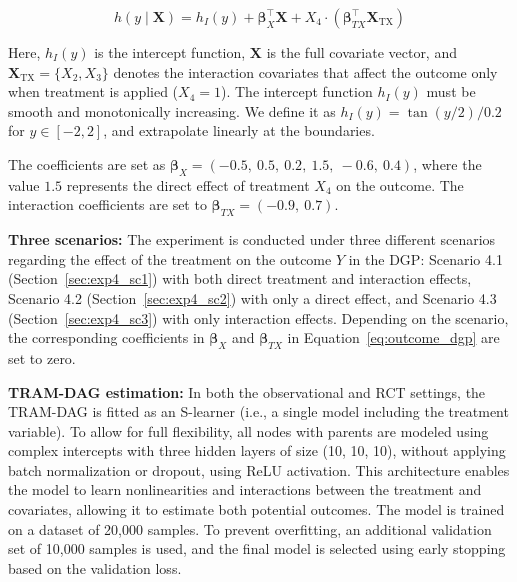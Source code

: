 \begin{equation}
h(y \mid \mathbf{X}) = h_I(y) + \boldsymbol{\beta}_X^\top \mathbf{X} + X_4 \cdot (\boldsymbol{\beta}_{TX}^\top \mathbf{X}_{\text{TX}})
\label{eq:outcome_dgp}
\end{equation}

Here, $h_I(y)$ is the intercept function, $\mathbf{X}$ is the full covariate vector, and $\mathbf{X}_{\text{TX}} = \{X_2, X_3\}$ denotes the interaction covariates that affect the outcome only when treatment is applied ($X_4 = 1$). The intercept function $h_I(y)$ must be smooth and monotonically increasing. We define it as $h_I(y) = \tan(y/2) / 0.2$ for $y \in [-2, 2]$, and extrapolate linearly at the boundaries.

The coefficients are set as $\boldsymbol{\beta}_X = (-0.5,\ 0.5,\ 0.2,\ 1.5,\ -0.6,\ 0.4)$, where the value $1.5$ represents the direct effect of treatment $X_4$ on the outcome. The interaction coefficients are set to $\boldsymbol{\beta}_{TX} = (-0.9,\ 0.7)$.

\medskip

\textbf{Three scenarios:} The experiment is conducted under three different scenarios regarding the effect of the treatment on the outcome $Y$ in the DGP: Scenario 4.1 (Section~\ref{sec:exp4_sc1}) with both direct treatment and interaction effects, Scenario 4.2 (Section~\ref{sec:exp4_sc2}) with only a direct effect, and Scenario 4.3 (Section~\ref{sec:exp4_sc3}) with only interaction effects. Depending on the scenario, the corresponding coefficients in $\boldsymbol{\beta}_X$ and $\boldsymbol{\beta}_{TX}$ in Equation~\ref{eq:outcome_dgp} are set to zero.

\medskip


\textbf{TRAM-DAG estimation:} In both the observational and RCT settings, the TRAM-DAG is fitted as an S-learner (i.e., a single model including the treatment variable). To allow for full flexibility, all nodes with parents are modeled using complex intercepts with three hidden layers of size (10, 10, 10), without applying batch normalization or dropout, using ReLU activation. This architecture enables the model to learn nonlinearities and interactions between the treatment and covariates, allowing it to estimate both potential outcomes. The model is trained on a dataset of 20,000 samples. To prevent overfitting, an additional validation set of 10,000 samples is used, and the final model is selected using early stopping based on the validation loss.

\medskip

